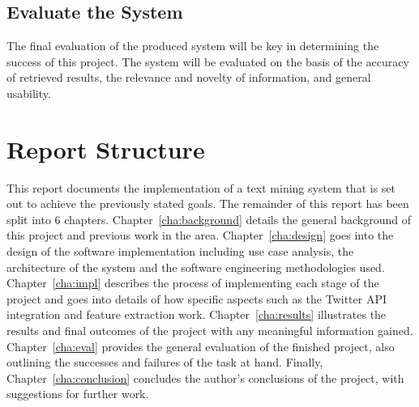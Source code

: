 \subsection{Evaluate the System}
The final evaluation of the produced system will be key in determining the success of this project. The system will be evaluated on the basis of the accuracy of retrieved results, the relevance and novelty of information, and general usability.

\section{Report Structure}
This report documents the implementation of a text mining system that is set out to achieve the previously stated goals. The remainder of this report has been split into 6 chapters.
Chapter~\ref{cha:background} details the general background of this project and previous work in the area.
Chapter~\ref{cha:design} goes into the design of the software implementation including use case analysis, the architecture of the system and the software engineering methodologies used.
Chapter~\ref{cha:impl} describes the process of implementing each stage of the project and goes into details of how specific aspects such as the Twitter API integration and feature extraction work.
Chapter~\ref{cha:results} illustrates the results and final outcomes of the project with any meaningful information gained.
Chapter~\ref{cha:eval} provides the general evaluation of the finished project, also outlining the successes and failures of the task at hand.
Finally, Chapter~\ref{cha:conclusion} concludes the author's conclusions of the project, with suggestions for further work.

